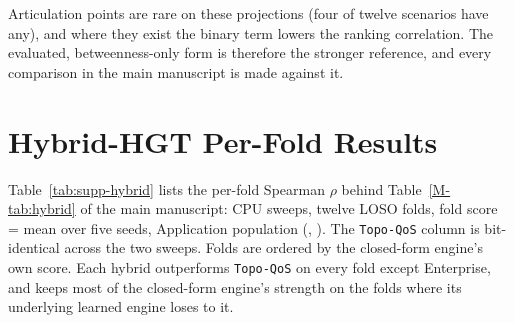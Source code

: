 \documentclass[preprint,3p]{elsarticle}
\begin{document}
\noindent Articulation points are rare on these projections (four of twelve scenarios have any), and where they exist the binary term lowers the ranking correlation. The evaluated, betweenness-only form is therefore the stronger reference, and every comparison in the main manuscript is made against it.


\section{Hybrid-HGT Per-Fold Results}
\label{supp:hybrid-folds}

Table~\ref{tab:supp-hybrid} lists the per-fold Spearman $\rho$ behind Table~\ref{M-tab:hybrid} of the main manuscript: CPU sweeps, twelve LOSO folds, fold score = mean over five seeds, Application population (, ). The \texttt{Topo-QoS} column is bit-identical across the two sweeps. Folds are ordered by the closed-form engine's own score. Each hybrid outperforms \texttt{Topo-QoS} on every fold except Enterprise, and keeps most of the closed-form engine's strength on the folds where its underlying learned engine loses to it.

\begin{table}[htbp]
\centering
\small
\caption{Per-fold LOSO $\rho$ for SaG's closed-form engine, the two learned engines and their hybrids (CPU sweeps; bold marks the best in each row).}
\label{tab:supp-hybrid}
\end{table}
\end{document}
